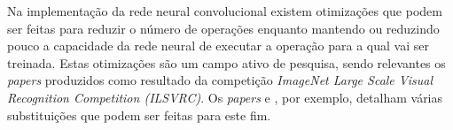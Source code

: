 Na implementação da rede neural convolucional existem otimizações que podem ser
feitas para reduzir o número de operações enquanto mantendo ou reduzindo pouco
a capacidade da rede neural de executar a operação para a qual vai ser
treinada. Estas otimizações são um campo ativo de pesquisa, sendo relevantes os
\emph{papers} produzidos como resultado da competição \emph{ImageNet Large
Scale Visual Recognition Competition (ILSVRC)}. Os \emph{papers}
\cite{szegedy2015going} e \cite{szegedy2015rethinking},
por exemplo, detalham várias substituições que podem ser feitas para este fim.


